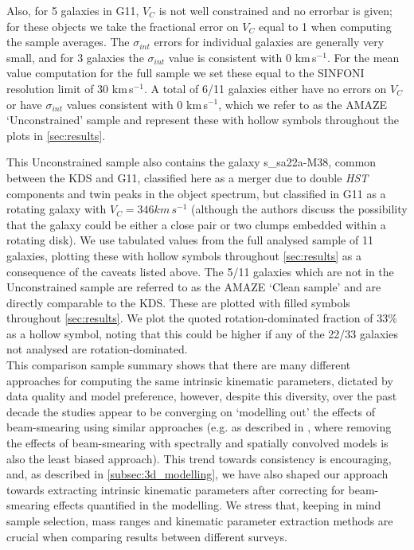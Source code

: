 \documentclass[fleqn,usenatbib]{mnras}
\begin{document}
\noindent
Also, for 5 galaxies in G11, $V_{C}$ is not well constrained and no errorbar is given; for these objects we take the fractional error on $V_{C}$ equal to 1 when computing the sample averages.
The $\sigma_{int}$ errors for individual galaxies are generally very small, and for 3 galaxies the $\sigma_{int}$ value is consistent with 0 km\,s$^{-1}$.
For the mean value computation for the full sample we set these equal to the SINFONI resolution limit of 30 km\,s$^{-1}$.
A total of 6/11 galaxies either have no errors on $V_{C}$ or have $\sigma_{int}$ values consistent with 0 km\,s$^{-1}$, which we refer to as the AMAZE `Unconstrained' sample and represent these with hollow symbols throughout the plots in \cref{sec:results}.

\noindent
This Unconstrained sample also contains the galaxy s\_sa22a-M38, common between the KDS and G11, classified here as a merger due to double {\em HST} components and twin peaks in the object spectrum, but classified in G11 as a rotating galaxy with $V_{C} = 346 km\,s^{-1}$ (although the authors discuss the possibility that the galaxy could be either a close pair or two clumps embedded within a rotating disk).
We use tabulated values from the full analysed sample of 11 galaxies, plotting these with hollow symbols throughout \cref{sec:results} as a consequence of the caveats listed above.
The 5/11 galaxies which are not in the Unconstrained sample are referred to as the AMAZE `Clean sample' and are directly comparable to the KDS.
These are plotted with filled symbols throughout \cref{sec:results}.
We plot the quoted rotation-dominated fraction of 33$\%$ as a hollow symbol, noting that this could be higher if any of the 22/33 galaxies not analysed are rotation-dominated. \\

\noindent
This comparison sample summary shows that there are many different approaches for computing the same intrinsic kinematic parameters, dictated by data quality and model preference, however, despite this diversity, over the past decade the studies appear to be converging on `modelling out' the effects of beam-smearing using similar approaches (e.g. as described in \citealt{Davies2011}, where removing the effects of beam-smearing with spectrally and spatially convolved models is also the least biased approach).
This trend towards consistency is encouraging, and, as described in \cref{subsec:3d_modelling}, we have also shaped our approach towards extracting intrinsic kinematic parameters after correcting for beam-smearing effects quantified in the modelling.
We stress that, keeping in mind sample selection, mass ranges and kinematic parameter extraction methods are crucial when comparing results between different surveys.
\end{document}

